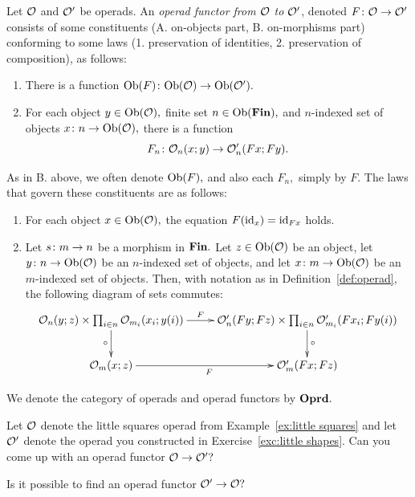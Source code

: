 \documentclass[CT4S-EN-RU]{subfiles}
\begin{document}
\begin{warningRUS}
\end{warningRUS}

\begin{definitionENG}\label{def:operad morphism}
Let $\mathcal{O}$ and $\mathcal{O}'$ be operads. An {\em operad functor from $\mathcal{O}$ to $\mathcal{O}'$}, denoted $F\colon\mathcal{O}\rightarrow\mathcal{O}'$ consists of some constituents (A. on-objects part, B. on-morphisms part) conforming to some laws (1. preservation of identities, 2. preservation of composition), as follows:
\begin{enumerate}[\hsp A.]
\item There is a function $\textnormal{Ob}(F)\colon\textnormal{Ob}(\mathcal{O})\rightarrow\textnormal{Ob}(\mathcal{O}').$
\item For each object $y\in\textnormal{Ob}(\mathcal{O}),$ finite set $n\in\textnormal{Ob}({\mathbf{Fin}}),$ and $n$-indexed set of objects $x\colon n\rightarrow\textnormal{Ob}(\mathcal{O}),$ there is a function $$F_n\colon\mathcal{O}_n(x;y)\rightarrow\mathcal{O}'_n(Fx;Fy).$$
\end{enumerate}
As in B. above, we often denote $\textnormal{Ob}(F),$ and also each $F_n,$ simply by $F.$ The laws that govern these constituents are as follows:
\begin{enumerate}[\hsp 1.]
\item For each object $x\in\textnormal{Ob}(\mathcal{O}),$ the equation $F(\textnormal{id}_x)=\textnormal{id}_{Fx}$ holds.
\item Let $s\colon m\rightarrow n$ be a morphism in ${\mathbf{Fin}}.$ Let $z\in\textnormal{Ob}(\mathcal{O})$ be an object, let $y\colon n\rightarrow\textnormal{Ob}(\mathcal{O})$ be an $n$-indexed set of objects, and let $x\colon m\rightarrow\textnormal{Ob}(\mathcal{O})$ be an $m$-indexed set of objects. Then, with notation as in Definition~\ref{def:operad}, the following diagram of sets commutes:
\begin{align}\label{dia:operad functor on composition}
\xymatrix{
\mcO_n(y;z)\times\prod_{i\in n}\mcO_{m_i}(x_i;y(i))\ar[r]^-F\ar[d]_\circ&
\mcO'_n(Fy;Fz)\times\prod_{i\in n}\mcO'_{m_i}(Fx_i;Fy(i))\ar[d]^\circ\\
\mcO_m(x;z)\ar[r]_F&\mcO'_m(Fx;Fz)
}
\end{align}
\end{enumerate}

We denote the category of operads and operad functors by ${\mathbf{Oprd}}.$
\end{definitionENG}

\begin{definitionRUS}\label{def:operad morphism}
\end{definitionRUS}

\begin{exerciseENG}
Let $\mathcal{O}$ denote the little squares operad from Example~\ref{ex:little squares} and let $\mathcal{O}'$ denote the operad you constructed in Exercise~\ref{exc:little shapes}.
\sexc Can you come up with an operad functor $\mathcal{O}\rightarrow\mathcal{O}'?$
\item Is it possible to find an operad functor $\mathcal{O}'\rightarrow\mathcal{O}?$ 
\endsexc
\end{exerciseENG}
\end{document}
